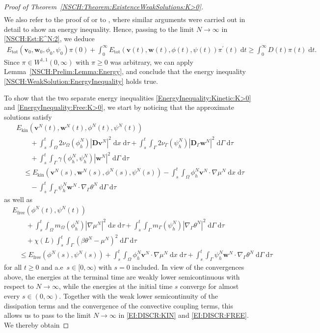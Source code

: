 \documentclass[11pt,reqno]{amsart}
\theoremstyle{remark}
\numberwithin{equation}{section}
\newcommand{\abs}[1]{|#1|}
\newcommand{\intO}{\int_\Omega}
\newcommand{\intG}{\int_\Gamma}
\newcommand{\dt}{\;\mathrm dt}
\newcommand{\dxtau}{\;\mathrm{d}x\;\mathrm{d}\tau}
\newcommand{\dGtau}{\;\mathrm{d}\Ga\;\mathrm{d}\tau}
\newcommand{\Grad}{\nabla}
\newcommand{\Gradg}{\nabla_\Ga}
\newcommand{\Om}{\Omega}
\newcommand{\Ga}{\Gamma}
\newcommand{\bv}{\mathbf v}
\newcommand{\bw}{\mathbf w}
\newcommand{\D}{\mathbf D}
\newcommand{\Dg}{\mathbf D_\Ga}
\newcommand{\free}{\mathrm{free}}
\begin{document}
\begin{proof}[Proof of Theorem~\ref{NSCH:Theorem:ExistenceWeakSolutions:K>0}]
\begin{align*}
\end{align*}
We also refer to the proof of \cite[Theorem~4.1]{Knopf2024} or to \cite[Proof of Theorem~3.3, Step~4]{Giorgini2023}, where similar arguments were carried out in detail to show an energy inequality.
Hence, passing to the limit $N\rightarrow\infty$ in \eqref{NSCH:Est:E^N:2}, we deduce
\begin{align*}
	E_{\mathrm{tot}}(\bv_0,\bw_0,\phi_0,\psi_0)\pi(0) + \int_0^\infty E_{\mathrm{tot}}(\bv(t),\bw(t),\phi(t),\psi(t))\pi^\prime(t)\dt \geq \int_0^\infty D(t)\pi(t)\dt.
\end{align*}
Since $\pi\in W^{1,1}(0,\infty)$ with $\pi \geq 0$ was arbitrary, we can apply Lemma~\ref{NSCH:Prelim:Lemma:Energy}, and conclude that the energy inequality \eqref{NSCH:WeakSolution:EnergyInequality} holds true.

To show that the two separate energy inequalities \eqref{EnergyInequality:Kinetic:K>0} and \eqref{EnergyInequality:Free:K>0}, we start by noticing that the approximate solutions satisfy
\begin{align}\label{EI:DISCR:KIN}
    &E_\mathrm{kin}(\bv^N(t),\bw^N(t),\phi^N(t),\psi^N(t)) \nonumber \\
    &\qquad + \int_s^t\intO2\nu_\Om(\phi_h^N)\abs{\D\bv^N}^2\dxtau + \int_s^t\intG 2\nu_\Ga(\psi_h^N)\abs{\Dg\bw^N}^2\dGtau \nonumber \\
    &\qquad + \int_s^t\intG \gamma(\phi_h^N,\psi_h^N)\abs{\bw^N}^2\dGtau \nonumber \\
    &\quad\leq E_\mathrm{kin}(\bv^N(s),\bw^N(s),\phi^N(s),\psi^N(s)) - \int_s^t\intO \phi_h^N\bv^N\cdot\Grad\mu^N\dxtau \nonumber \\
    &\qquad - \int_s^t\intG\psi_h^N\bw^N\cdot\Gradg\theta^N\dGtau
\end{align}
as well as
\begin{align}\label{EI:DISCR:FREE}
    &E_\free(\phi^N(t),\psi^N(t)) \nonumber \\
    &\qquad + \int_s^t\intO m_\Om(\phi_h^N)\abs{\Grad\mu^N}^2\dxtau + \int_s^t\intG m_\Ga(\psi_h^N)\abs{\Gradg\theta^N}^2\dGtau \nonumber \\
    &\qquad + \chi(L)\int_s^t\intG (\beta\theta^N-\mu^N)^2\dGtau \nonumber \\
    &\quad\leq E_\free(\phi^N(s),\psi^N(s)) + \int_s^t\intO \phi_h^N\bv^N\cdot\Grad\mu^N\dxtau + \int_s^t\intG \psi_h^N\bw^N\cdot\Gradg\theta^N\dGtau
\end{align}
for all $t\geq 0$ and a.e~$s\in[0,\infty)$ with $s = 0$ included. In view of the convergences above, the energies at the terminal time are weakly lower semicontinuous with respect to $N\rightarrow\infty$, while the energies at the initial time $s$ converge for almost every $s\in(0,\infty)$. Together with the weak lower semicontinuity of the dissipation terms and the convergence of the convective coupling terms, this allows us to pass to the limit $N\rightarrow\infty$ in \eqref{EI:DISCR:KIN} and \eqref{EI:DISCR:FREE}. We thereby obtain 

\end{proof}
\end{document}

